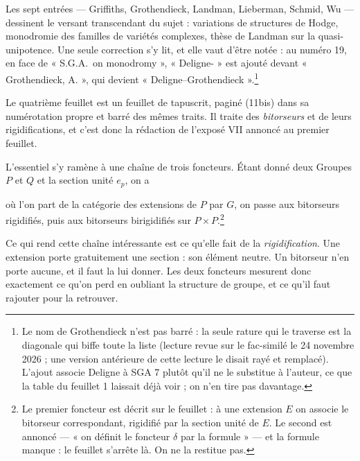 \documentclass[11pt,a4paper]{article}
\begin{document}
Les sept entrées --- Griffiths, Grothendieck, Landman, Lieberman, Schmid,
Wu --- dessinent le versant transcendant du sujet : variations de structures de
Hodge, monodromie des familles de variétés complexes, thèse de Landman sur la
quasi-unipotence. Une seule correction s'y lit, et elle vaut d'être notée : au
numéro 19, en face de « S.G.A.\ on monodromy », « Deligne- » est ajouté devant
« Grothendieck, A. », qui devient « Deligne--Grothendieck ».\footnote{Le nom de
Grothendieck n'est pas barré : la seule rature qui le traverse est la diagonale
qui biffe toute la liste (lecture revue sur le fac-similé le 24 novembre 2026 ;
une version antérieure de cette lecture le disait rayé et remplacé). L'ajout
associe Deligne à SGA 7 plutôt qu'il ne le substitue à l'auteur, ce que la table
du feuillet 1 laissait déjà voir ; on n'en tire pas davantage.}

Le quatrième feuillet est un feuillet de tapuscrit, paginé (11bis) dans sa
numérotation propre et barré des mêmes traits. Il traite des \emph{bitorseurs}
et de leurs rigidifications, et c'est donc la rédaction de l'exposé VII annoncé
au premier feuillet.

L'essentiel s'y ramène à une chaîne de trois foncteurs. Étant donné deux
Groupes $P$ et $Q$ et la section unité $e_{p}$, on a


où l'on part de la catégorie des extensions de $P$ par $G$, on passe aux
bitorseurs rigidifiés, puis aux bitorseurs birigidifiés sur $P \times
P$.\footnote{Le premier foncteur est décrit sur le feuillet : à une extension
$E$ on associe le bitorseur correspondant, rigidifié par la section unité de
$E$. Le second est annoncé --- « on définit le foncteur $\delta$ par la
formule » --- et la formule manque : le feuillet s'arrête là. On ne la
restitue pas.}

Ce qui rend cette chaîne intéressante est ce qu'elle fait de la
\emph{rigidification}. Une extension porte gratuitement une section : son
élément neutre. Un bitorseur n'en porte aucune, et il faut la lui donner. Les
deux foncteurs mesurent donc exactement ce qu'on perd en oubliant la structure
de groupe, et ce qu'il faut rajouter pour la retrouver.

\end{document}

